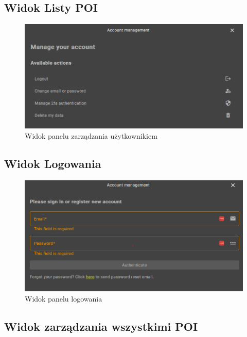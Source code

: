\subsection{Widok Listy POI}
\label{sec:user}

\begin{figure}[H]
    \centering
    \includegraphics[width=1\textwidth]{attachments/user}
    \caption{Widok panelu zarządzania użytkownikiem}
    \label{fig:user}
\end{figure}

\subsection{Widok Logowania}
\label{sec:logowanie}

\begin{figure}[H]
    \centering
    \includegraphics[width=1\textwidth]{attachments/logowanie}
    \caption{Widok panelu logowania}
    \label{fig:logowanie}
\end{figure}

\subsection{Widok zarządzania wszystkimi POI}
\label{sec:manage}

